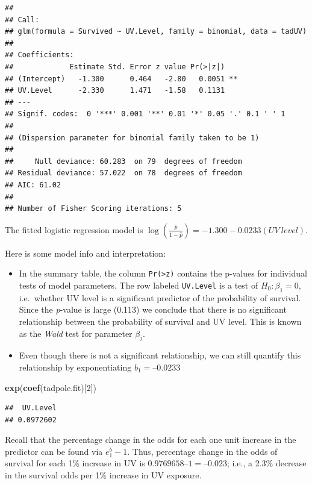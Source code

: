 \documentclass[
]{book}
\newenvironment{Shaded}{\begin{snugshade}}{\end{snugshade}}
\newcommand{\DecValTok}[1]{\textcolor[rgb]{0.00,0.00,0.81}{#1}}
\newcommand{\FunctionTok}[1]{\textcolor[rgb]{0.13,0.29,0.53}{\textbf{#1}}}
\newcommand{\NormalTok}[1]{#1}
\providecommand{\tightlist}{%
  \setlength{\itemsep}{0pt}\setlength{\parskip}{0pt}}
\begin{document}
\begin{verbatim}
## 
## Call:
## glm(formula = Survived ~ UV.Level, family = binomial, data = tadUV)
## 
## Coefficients:
##             Estimate Std. Error z value Pr(>|z|)   
## (Intercept)   -1.300      0.464   -2.80   0.0051 **
## UV.Level      -2.330      1.471   -1.58   0.1131   
## ---
## Signif. codes:  0 '***' 0.001 '**' 0.01 '*' 0.05 '.' 0.1 ' ' 1
## 
## (Dispersion parameter for binomial family taken to be 1)
## 
##     Null deviance: 60.283  on 79  degrees of freedom
## Residual deviance: 57.022  on 78  degrees of freedom
## AIC: 61.02
## 
## Number of Fisher Scoring iterations: 5
\end{verbatim}

The fitted logistic regression model is \(\log\left(\frac{\hat{p}}{1-\hat{p}}\right) = -1.300 - 0.0233(UV~level)\).

Here is some model info and interpretation:

\begin{itemize}
\tightlist
\item
  In the summary table, the column \texttt{Pr(\textgreater{}\textbar{}z\textbar{})} contains the p-values for individual tests of model parameters. The row labeled \texttt{UV.Level} is a test of \(H_0 : \beta_1 = 0\), i.e.~whether UV level is a significant predictor of the probability of survival. Since the \emph{p}-value is large (0.113) we conclude that there is no significant relationship between the probability of survival and UV level. This is known as the \emph{Wald} test for parameter \(\beta_j\).
\item
  Even though there is not a significant relationship, we can still quantify this relationship by exponentiating \(b_1 = –0.0233\)
\end{itemize}

\begin{Shaded}
\begin{Highlighting}[]
\FunctionTok{exp}\NormalTok{(}\FunctionTok{coef}\NormalTok{(tadpole.fit)[}\DecValTok{2}\NormalTok{])}
\end{Highlighting}
\end{Shaded}

\begin{verbatim}
##  UV.Level 
## 0.0972602
\end{verbatim}

Recall that the percentage change in the odds for each one unit increase in the predictor can be found via \(e^b_1 − 1\). Thus, percentage change in the odds of survival for each 1\% increase in UV is \(0.9769658 – 1 = –0.023\); i.e., a 2.3\% decrease in the survival odds per 1\% increase in UV exposure.
\end{document}
